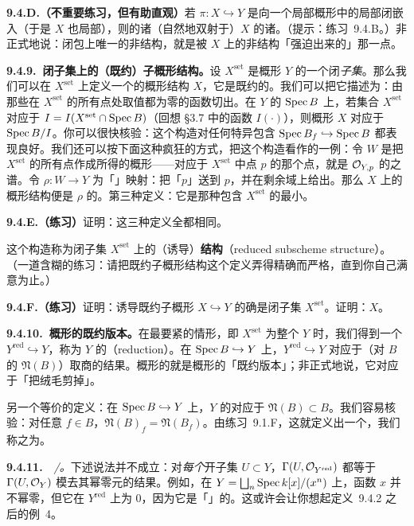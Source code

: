 \textbf{9.4.D.（不重要练习，但有助直观）}\quad 若 $\pi\colon X\hookrightarrow Y$ 是向一个局部\trNoetherian{}概形中的局部闭嵌入（于是 $X$ 也局部\trNoetherian），则\trSchemeTheoretic\trClosure{}的诸\trAssociatedPoint{}（自然地双射于）$X$ 的诸\trAssociatedPoint。（提示：\mbox{练习~9.4.B}。）非正式地说：\trSchemeTheoretic{}闭包上唯一的非\trReduced{}结构，就是被 $X$ 上的非\trReduced{}结构「强迫出来的」那一点。

\textbf{9.4.9.\ 闭子集上的（既约）子概形结构。}\quad 设 $X^{\mathrm{set}}$ 是概形 $Y$ 的一个闭\emph{子集}。那么我们可以在 $X^{\mathrm{set}}$ 上定义一个\trCanonical{}的概形结构 $X$，它是既约的。我们可以把它描述为：由那些在 $X^{\mathrm{set}}$ 的所有点处取值都为零的函数切出。在 $Y$ 的\trAffine\trOpenSet{} $\operatorname{Spec} B$ 上，若集合 $X^{\mathrm{set}}$ 对应于\trRadicalIdeal{} $I=I(X^{\mathrm{set}}\cap\operatorname{Spec} B)$（回想 \S3.7 中的函数 $I(\cdot)$），则概形 $X$ 对应于 $\operatorname{Spec} B/I$。你可以很快核验：这个构造对任何特异包含 $\operatorname{Spec} B_f\hookrightarrow\operatorname{Spec} B$ 都表现良好。我们还可以按下面这种疯狂的方式，把这个构造看作\trSchemeTheoreticImage{}的一例：令 $W$ 是把 $X^{\mathrm{set}}$ 的所有点作成\trDisjointUnion{}所得的概形——对应于 $X^{\mathrm{set}}$ 中点 $p$ 的那个点，就是 $\mathcal{O}_{Y,p}$ 的\trResidueField{}之谱。令 $\rho\colon W\to Y$ 为「\trCanonical」映射：把「$p$」送到 $p$，并在剩余域上给出\trIsomorphism。那么 $X$ 上的概形结构便是 $\rho$ 的\trSchemeTheoreticImage{}。第三种定义：它是那种\trUnderlyingSet{}包含 $X^{\mathrm{set}}$ 的最小\trClosedSubscheme。

\textbf{9.4.E.（练习）}\quad 证明：这三种定义全都相同。

这个构造称为闭子集 $X^{\mathrm{set}}$ 上的（诱导）\textbf{\trReduced\trSubscheme{}结构}（reduced subscheme structure）。（一道含糊的练习：请把既约子概形结构这个定义弄得精确而严格，直到你自己满意为止。）

\textbf{9.4.F.（练习）}\quad 证明：诱导既约子概形 $X\hookrightarrow Y$ 的\trUnderlyingSet{}确是闭子集 $X^{\mathrm{set}}$。证明：$X$\trReduced。

\textbf{9.4.10.\ 概形的既约版本。}\quad 在最要紧的情形，即 $X^{\mathrm{set}}$ 为整个 $Y$ 时，我们得到一个\emph{\trReduced\trClosedSubscheme} $Y^{\mathrm{red}}\hookrightarrow Y$，称为 $Y$ 的\textbf{\trReduction{}}（reduction）。在\trAffine\trOpenSubset{} $\operatorname{Spec} B\hookrightarrow Y$ 上，$Y^{\mathrm{red}}\hookrightarrow Y$ 对应于（对 $B$ 的\trNilradical{} $\mathfrak{N}(B)$）取商的结果。概形的\trReduction{}就是概形的「既约版本」；非正式地说，它对应于「把绒毛剪掉」。

另一个等价的\trReduction{}定义：在\trAffine\trOpenSubset{} $\operatorname{Spec} B\hookrightarrow Y$ 上，$Y$ 的\trReduction{}对应于\trNilradical{} $\mathfrak{N}(B)\subset B$。我们容易核验：对任意 $f\in B$，$\mathfrak{N}(B)_f=\mathfrak{N}(B_f)$。由\mbox{练习~9.1.F}，这就定义出一个\trClosedSubscheme，我们称之为\trReduction{}。

\textbf{9.4.11.}\ \hard\ \emph{\trhCaveat{}/\trhExample{}。}\quad 下述说法并不成立：对\emph{每个}开子集 $U\subset Y$，$\Gamma(U,\mathcal{O}_{Y^{\mathrm{red}}})$ 都等于 $\Gamma(U,\mathcal{O}_Y)$ 模去其幂零元的结果。例如，在 $Y=\bigsqcup_n\operatorname{Spec} k[x]/(x^n)$ 上，函数 $x$ 并不幂零，但它在 $Y^{\mathrm{red}}$ 上为 $0$，因为它是「\trLocally\trNilpotent」的。这或许会让你想起定义~9.4.2 之后的例~4。
